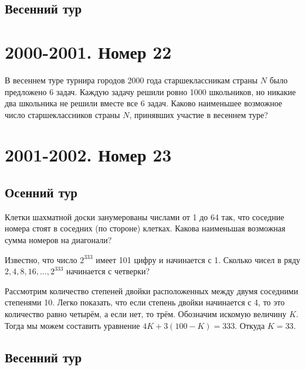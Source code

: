 \documentclass[11pt, a4paper]{common/document_template}
\begin{document}
\section{Весенний тур}


\chapter{2000-2001. Номер 22}

\begin{exercise}
В весеннем туре турнира городов 2000 года старшеклассникам страны $N$ было предложено 6 задач. Каждую задачу решили ровно 1000 школьников, но никакие два школьника не решили вместе все 6 задач. Каково наименьшее возможное число старшеклассников страны $N$, принявших участие в весеннем туре?
\end{exercise}

\chapter{2001-2002. Номер 23}

\section{Осенний тур}

\begin{exercise}
Клетки шахматной доски занумерованы числами от 1 до 64 так, что соседние номера стоят в соседних (по стороне) клетках. Какова наименьшая возможная сумма номеров на диагонали?
\end{exercise}

\begin{exercise}
Известно, что число $2^{333}$ имеет 101 цифру и начинается с 1. Сколько чисел в ряду $2, 4, 8, 16, \dots, 2^{333}$ начинается с четверки?
\end{exercise}

\begin{Solution}
Рассмотрим количество степеней двойки расположенных между двумя соседними степенями 10. Легко показать, что если степень двойки начинается с 4, то это количество равно четырём, а если нет, то трём. Обозначим искомую величину $K$. Тогда мы можем составить уравнение $4K + 3(100 - K) = 333$.  Откуда $K = 33$.
\end{Solution}

\section{Весенний тур}
\end{document}
